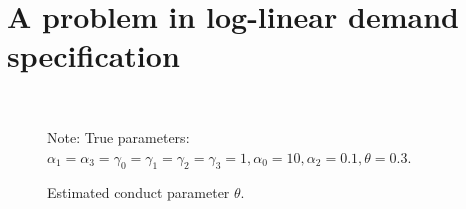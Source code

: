 \documentclass[11pt, a4paper]{article}
\begin{document}
\section{A problem in log-linear demand specification}



\begin{figure}[!htbp]
  \begin{center}
  \\
  \caption{Estimated conduct parameter $\theta$.}
  \label{fg:histogram_loglinear_loglinear_n_1000_sigma_2} 
  \end{center}
  \footnotesize
  Note: True parameters: $\alpha_1 = \alpha_3 = \gamma_0 = \gamma_1 = \gamma_2  = \gamma_3 = 1, \alpha_0 = 10, \alpha_2 = 0.1,  \theta = 0.3.$
\end{figure} 
\end{document}
